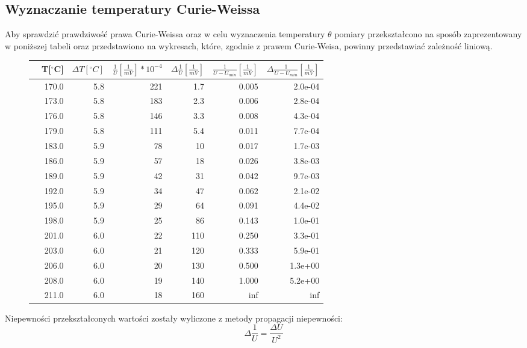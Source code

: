 \documentclass[a4paper,10pt]{article}
\begin{document}
\subsection{Wyznaczanie temperatury Curie-Weissa}
Aby sprawdzić prawdziwość prawa Curie-Weissa oraz w celu wyznaczenia temperatury $\theta$ pomiary przekształcono na sposób zaprezentowany w poniższej tabeli oraz przedstawiono na wykresach, które, zgodnie z prawem Curie-Weisa, powinny przedstawiać zależność liniową.
\begin{figure}
\begin{tabular}{lrrrrrr}
\toprule
{} &  T[$^\circ $C] &  $\Delta T [^\circ C]$ &  $\frac{1}{U}[\frac{1}{mV}]*10^{-4}$ &  $\Delta \frac{1}{U}[\frac{1}{mV}]$ &  $\frac{1}{U-U_{min}}[\frac{1}{mV}]$ &  $\Delta \frac{1}{U-U_{min}}[\frac{1}{mV}]$ \\
\midrule
& 170.0 &  5.8 & 221 & 1.7 & 0.005 &   2.0e-04 \\
& 173.0 &  5.8 & 183 & 2.3 & 0.006 &   2.8e-04 \\
& 176.0 &  5.8 & 146 & 3.3 & 0.008 &   4.3e-04 \\
& 179.0 &  5.8 & 111 & 5.4 & 0.011 &   7.7e-04 \\
& 183.0 &  5.9 &  78 & 10  & 0.017 &   1.7e-03 \\
& 186.0 &  5.9 &  57 & 18  & 0.026 &   3.8e-03 \\
& 189.0 &  5.9 &  42 & 31  & 0.042 &   9.7e-03 \\
& 192.0 &  5.9 &  34 & 47  & 0.062 &   2.1e-02 \\
& 195.0 &  5.9 &  29 & 64  & 0.091 &   4.4e-02 \\
& 198.0 &  5.9 &  25 & 86  & 0.143 &   1.0e-01 \\
& 201.0 &  6.0 &  22 & 110 & 0.250 &   3.3e-01 \\
& 203.0 &  6.0 &  21 & 120 & 0.333 &   5.9e-01 \\
& 206.0 &  6.0 &  20 & 130 & 0.500 &   1.3e+00 \\
& 208.0 &  6.0 &  19 & 140 & 1.000 &   5.2e+00 \\
& 211.0 &  6.0 &  18 & 160 &   inf &       inf \\
\bottomrule
\end{tabular}
\end{figure}
Niepewności przekształconych wartości zostały wyliczone z metody propagacji niepewności:
\begin{equation}
\Delta \frac{1}{U} = \frac{\Delta U}{U^2}
\end{equation}
\end{document}
